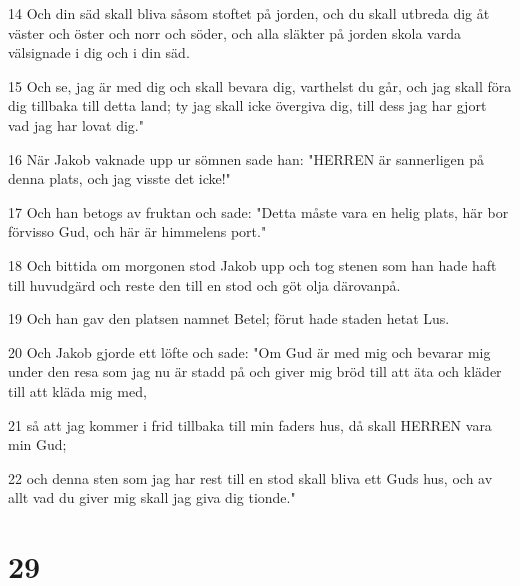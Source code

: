 \par 14 Och din säd skall bliva såsom stoftet på jorden, och du skall utbreda dig åt väster och öster och norr och söder, och alla släkter på jorden skola varda välsignade i dig och i din säd.
\par 15 Och se, jag är med dig och skall bevara dig, varthelst du går, och jag skall föra dig tillbaka till detta land; ty jag skall icke övergiva dig, till dess jag har gjort vad jag har lovat dig."
\par 16 När Jakob vaknade upp ur sömnen sade han: "HERREN är sannerligen på denna plats, och jag visste det icke!"
\par 17 Och han betogs av fruktan och sade: "Detta måste vara en helig plats, här bor förvisso Gud, och här är himmelens port."
\par 18 Och bittida om morgonen stod Jakob upp och tog stenen som han hade haft till huvudgärd och reste den till en stod och göt olja därovanpå.
\par 19 Och han gav den platsen namnet Betel; förut hade staden hetat Lus.
\par 20 Och Jakob gjorde ett löfte och sade: "Om Gud är med mig och bevarar mig under den resa som jag nu är stadd på och giver mig bröd till att äta och kläder till att kläda mig med,
\par 21 så att jag kommer i frid tillbaka till min faders hus, då skall HERREN vara min Gud;
\par 22 och denna sten som jag har rest till en stod skall bliva ett Guds hus, och av allt vad du giver mig skall jag giva dig tionde."

\chapter{29}

